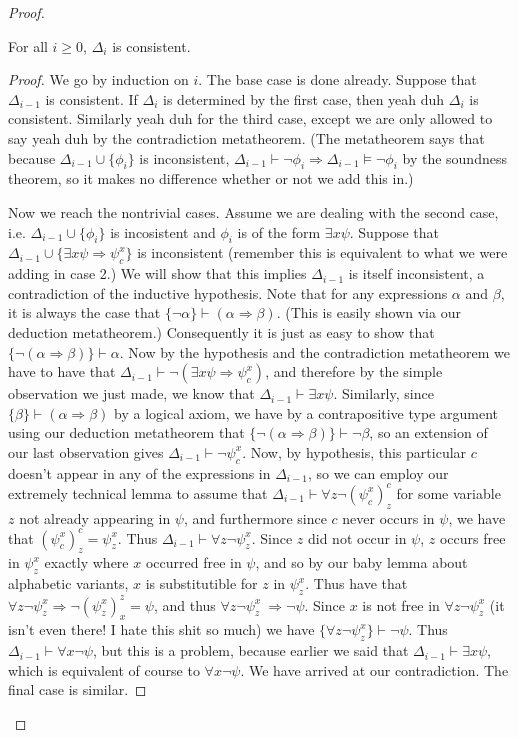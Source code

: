 \begin{proof}
    \begin{fact}
        For all $i \geq 0$, $\Delta_i$ is consistent.
    \end{fact}
    \begin{proof}
        We go by induction on $i$. The base case is done already. Suppose that $\Delta_{i-1}$ is consistent. If $\Delta_i$ is determined by the first case, then yeah duh $\Delta_i$ is consistent. Similarly yeah duh for the third case, except we are only allowed to say yeah duh by the contradiction metatheorem. (The metatheorem says that because $\Delta_{i-1} \cup \{\phi_i\}$ is inconsistent, $\Delta_{i-1} \vdash \neg \phi_i \Rightarrow \Delta_{i-1} \models \neg \phi_i$ by the soundness theorem, so it makes no difference whether or not we add this in.)
        \par Now we reach the nontrivial cases. Assume we are dealing with the second case, i.e. $\Delta_{i-1} \cup \{\phi_i\}$ is incosistent and $\phi_i$ is of the form $\exists x \psi$. Suppose that $\Delta_{i-1} \cup \{\exists x \psi \Rightarrow \psi_c^x\}$ is inconsistent (remember this is equivalent to what we were adding in case 2.) We will show that this implies $\Delta_{i-1}$ is itself inconsistent, a contradiction of the inductive hypothesis. Note that for any expressions $\alpha$ and $\beta$, it is always the case that $\{\neg \alpha\} \vdash (\alpha \Rightarrow \beta)$. (This is easily shown via our deduction metatheorem.) Consequently it is just as easy to show that $\{\neg(\alpha \Rightarrow \beta)\} \vdash \alpha$. Now by the hypothesis and the contradiction metatheorem we have to have that $\Delta_{i-1} \vdash \neg (\exists x \psi \Rightarrow \psi_c^x)$, and therefore by the simple observation we just made, we know that $\Delta_{i-1} \vdash \exists x \psi$. Similarly, since $\{\beta\} \vdash (\alpha \Rightarrow \beta)$ by a logical axiom, we have by a contrapositive type argument using our deduction metatheorem that $\{\neg(\alpha \Rightarrow \beta)\} \vdash \neg \beta$, so an extension of our last observation gives $\Delta_{i-1} \vdash \neg \psi_c^x$. Now, by hypothesis, this particular $c$ doesn't appear in any of the expressions in $\Delta_{i-1}$, so we can employ our extremely technical lemma to assume that $\Delta_{i-1} \vdash \forall z \neg (\psi_c^x)_z^c$ for some variable $z$ not already appearing in $\psi$, and furthermore since $c$ never occurs in $\psi$, we have that $(\psi_c^x)_z^c = \psi_z^x$. Thus $\Delta_{i-1} \vdash \forall z\neg \psi_z^x$. Since $z$ did not occur in $\psi$, $z$ occurs free in $\psi_z^x$ exactly where $x$ occurred free in $\psi$, and so by our baby lemma about alphabetic variants, $x$ is substitutible for $z$ in $\psi_z^x$. Thus have that $\forall z \neg \psi_z^x \Rightarrow \neg (\psi_z^x)_x^z = \psi$, and thus $\forall z \neg \psi_z^x\ \Rightarrow \neg \psi$. Since $x$ is not free in $\forall z \neg \psi_z^x$ (it isn't even there! I hate this shit so much) we have $\{\forall z \neg \psi_z^x\} \vdash \neg \psi$. Thus $\Delta_{i-1} \vdash \forall x \neg \psi$, but this is a problem, because earlier we said that $\Delta_{i-1} \vdash \exists x \psi$, which is equivalent of course to $\forall x \neg \psi$. We have arrived at our contradiction. The final case is similar. 

\end{proof}
\end{proof}
